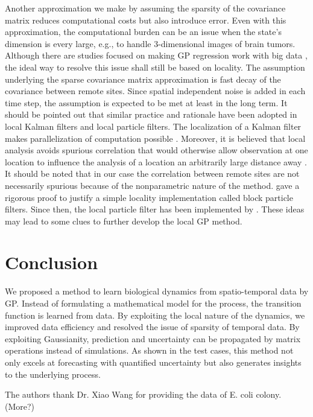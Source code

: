 \documentclass[smallextended,natbib]{svjour3}       %
\begin{document}
Another approximation we make by assuming the sparsity of the covariance matrix reduces computational costs but also introduce error. Even with this approximation, the computational burden can be an issue when the state's dimension is every large, e.g., to handle 3-dimensional images of brain tumors. Although there are studies focused on making GP regression work with big data \citep{liu2020gaussian}, the ideal way to resolve this issue shall still be based on locality. The assumption underlying the sparse covariance matrix approximation is fast decay of the covariance between remote sites. Since spatial independent noise is added in each time step, the assumption is expected to be met at least in the long term. It should be pointed out that similar practice and rationale have been adopted in local Kalman filters and local particle filters. The localization of a Kalman filter makes parallelization of computation possible \citep{ott2004local,Hunt2007,szunyogh2008local}. Moreover, it is believed that local analysis avoids spurious correlation that would otherwise allow observation at one location to influence the analysis of a  location an arbitrarily large distance away \citep{Hunt2007}. It should be noted that in our case the correlation between remote sites are not necessarily spurious because of the nonparametric nature of the method. \cite{Rebeschini2015} gave a rigorous proof to justify a simple locality implementation called block particle filters. Since then, the local particle filter has been implemented by \cite{morzfeld2018variational,farchi2018comparison}. These ideas may lead to some clues to further develop the local GP method.     


\section{Conclusion}
We proposed a method to learn biological dynamics from spatio-temporal data by GP.  Instead of formulating a mathematical model for the process,  the transition function is learned from data. By exploiting the local nature of the dynamics, we improved data efficiency and resolved the issue of sparsity of temporal data. By exploiting Gaussianity, prediction and uncertainty can be propagated by matrix operations instead of simulations. As shown in the test cases, this method not only excels at forecasting with quantified uncertainty but also generates insights to the underlying process. 

\begin{acknowledgements}
The authors thank Dr. Xiao Wang for providing the data of E. coli colony. (More?)
\end{acknowledgements}
\end{document}
